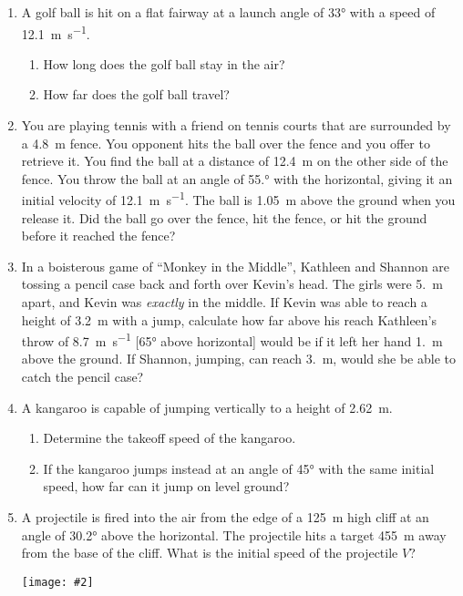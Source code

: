 \documentclass[11pt,titlepage,twoside]{article}
\newcommand{\pic}[2]{ \texttt{[image: \#2]} }
\begin{document}
\begin{enumerate}[
    label=\textbf{Example \arabic*:},
    itemindent=65pt,
    leftmargin=0pt]
\item A golf ball is hit on a flat fairway at a launch angle of \ang{33} with a
  speed of \SI{12.1}{\metre\per\second}.
  \begin{enumerate}
  \item How long does the golf ball stay in the air?
  \item How far does the golf ball travel?
  \end{enumerate}
  \newpage

\item You are playing tennis with a friend on tennis courts that are surrounded
  by a \SI{4.8}{\metre} fence. You opponent hits the ball over the fence and
  you offer to retrieve it. You find the ball at a distance of
  \SI{12.4}{\metre} on the other side of the fence. You throw the ball at an
  angle of \ang{55.} with the horizontal, giving it an initial velocity of
  \SI{12.1}{\metre\per\second}. The ball is \SI{1.05}{\metre} above the ground
  when you release it. Did the ball go over the fence, hit the fence, or hit
  the ground before it reached the fence? %
  \newpage
  
\item In a boisterous game of ``Monkey in the Middle'', Kathleen and Shannon
  are tossing a pencil case back and forth over Kevin's head. The girls were
  \SI{5.}{\metre} apart, and Kevin was \emph{exactly} in the middle. If Kevin
  was able to reach a height of \SI{3.2}{\metre} with a jump, calculate how far
  above his reach Kathleen's throw of \SI{8.7}{\metre\per\second} [\ang{65}
    above horizontal] would be if it left her hand \SI{1.}{\metre} above the
  ground. If Shannon, jumping, can reach \SI{3.}{\metre}, would she be able to
  catch the pencil case?
  \newpage
  
\item A kangaroo is capable of jumping vertically to a height of
  \SI{2.62}{\metre}.
  \begin{enumerate}
  \item Determine the takeoff speed of the kangaroo.
  \item If the kangaroo jumps instead at an angle of \ang{45} with the same
    initial speed, how far can it jump on level ground?
  \end{enumerate}
  \newpage
  
\item A projectile is fired into the air from the edge of a \SI{125}{\metre}
  high cliff at an angle of \ang{30.2} above the horizontal. The projectile
  hits a target \SI{455}{\metre} away from the base of the cliff. What is the
  initial speed of the projectile $V$?

  \pic{1}{../graphics/projectile_motion_problems_image1}
\end{enumerate}
\newpage
\end{document}
